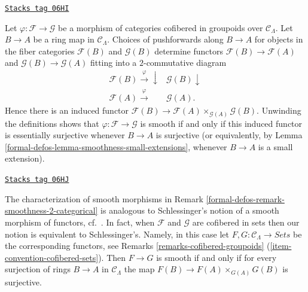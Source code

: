 \begin{remark}
\label{formal-defos-remark-smoothness-2-categorical}
\href{https://stacks.math.columbia.edu/tag/06HI}{\texttt{Stacks tag 06HI}}

Let $\varphi : \mathcal{F} \to \mathcal{G}$ be a morphism of categories
cofibered in groupoids over $\mathcal{C}_\Lambda$.  Let $B \to A$ be a
ring map in $\mathcal{C}_\Lambda$.  Choices of pushforwards along $B
\to A$ for objects in the fiber categories $\mathcal{F}(B)$ and
$\mathcal{G}(B)$ determine functors $\mathcal{F}(B) \to \mathcal{F}(A)$
and $\mathcal{G}(B) \to \mathcal{G}(A)$ fitting into a $2$-commutative
diagram
$$
\begin{array}{cc}\mathcal{F}(B) \overset{\varphi}{\longrightarrow}\downarrow & \mathcal{G}(B) \downarrow \\ \mathcal{F}(A) \overset{\varphi}{\longrightarrow} & \mathcal{G}(A) .\end{array}
$$
Hence there is an induced functor $\mathcal{F}(B) \to \mathcal{F}(A)
\times_{\mathcal{G}(A)} \mathcal{G}(B)$.  Unwinding the definitions shows that
$\varphi : \mathcal{F} \to \mathcal{G}$ is smooth if and only if this
induced functor is essentially surjective whenever $B \to A$ is
surjective (or equivalently, by
Lemma \ref{formal-defos-lemma-smoothness-small-extensions},
whenever $B \to A$ is a small extension).
\end{remark}

\begin{remark}
\label{formal-defos-remark-compare-smooth-schlessinger}
\href{https://stacks.math.columbia.edu/tag/06HJ}{\texttt{Stacks tag 06HJ}}

The characterization of smooth morphisms in
Remark \ref{formal-defos-remark-smoothness-2-categorical}
is analogous to Schlessinger's notion of
a smooth morphism of functors, cf.\ \cite[Definition 2.2.]{Sch}. In
fact, when $\mathcal{F}$ and $\mathcal{G}$ are cofibered in sets
then our notion is equivalent to Schlessinger's. Namely, in this case
let $F, G : \mathcal{C}_\Lambda \to \textit{Sets}$ be the corresponding
functors, see
Remarks \ref{remarks-cofibered-groupoids}
(\ref{item-convention-cofibered-sets}).
Then $F \to G$ is smooth if and only if for every surjection of rings
$B \to A$ in $\mathcal{C}_\Lambda$ the map $F(B) \to F(A) \times_{G(A)} G(B)$
is surjective.
\end{remark}

